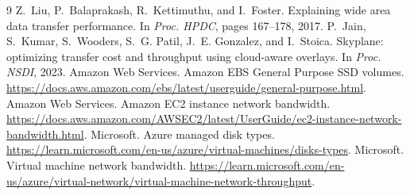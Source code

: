 \documentclass[11pt,a4paper]{article}
\begin{document}
\begin{thebibliography}{9}\small
{} Z.~Liu, P.~Balaprakash, R.~Kettimuthu, and I.~Foster. Explaining wide area data transfer performance. In \emph{Proc. HPDC}, pages 167--178, 2017.
 P.~Jain, S.~Kumar, S.~Wooders, S.~G. Patil, J.~E. Gonzalez, and I.~Stoica. Skyplane: optimizing transfer cost and throughput using cloud-aware overlays. In \emph{Proc. NSDI}, 2023.
 Amazon Web Services. Amazon EBS General Purpose SSD volumes. \url{https://docs.aws.amazon.com/ebs/latest/userguide/general-purpose.html}.
 Amazon Web Services. Amazon EC2 instance network bandwidth. \url{https://docs.aws.amazon.com/AWSEC2/latest/UserGuide/ec2-instance-network-bandwidth.html}.
 Microsoft. Azure managed disk types. \url{https://learn.microsoft.com/en-us/azure/virtual-machines/disks-types}.
 Microsoft. Virtual machine network bandwidth. \url{https://learn.microsoft.com/en-us/azure/virtual-network/virtual-machine-network-throughput}.
\end{thebibliography}
\end{document}
